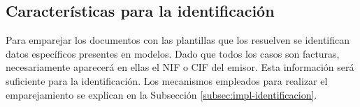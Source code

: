 
\subsection{Características para la identificación}

Para emparejar los documentos con las plantillas que los resuelven se identifican datos específicos presentes en modelos. Dado que todos los casos son facturas, necesariamente aparecerá en ellas el NIF o CIF del emisor. Esta información será suficiente para la identificación. Los mecanismos empleados para realizar el emparejamiento se explican en la Subsección \ref{subsec:impl-identificacion}.

